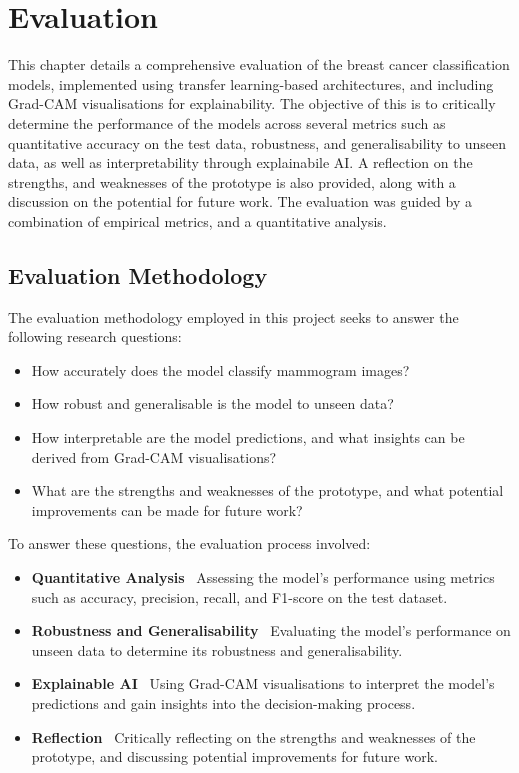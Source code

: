 \documentclass[../main]{subfiles}
\begin{document}
\chapter{Evaluation}
\label{ch:evaluation}
This chapter details a comprehensive evaluation of the breast cancer classification models, implemented using transfer learning-based architectures, and including Grad-CAM visualisations for explainability. The objective of this is to critically determine the performance of the models across several metrics such as quantitative accuracy on the test data, robustness, and generalisability to unseen data, as well as interpretability through explainabile AI. A reflection on the strengths, and weaknesses of the prototype is also provided, along with a discussion on the potential for future work. The evaluation was guided by a combination of empirical metrics, and a quantitative analysis.

\section{Evaluation Methodology}
\label{sec:evaluation-methodology}
The evaluation methodology employed in this project seeks to answer the following research questions:
\begin{itemize}
    \item How accurately does the model classify mammogram images?
    \item How robust and generalisable is the model to unseen data?
    \item How interpretable are the model predictions, and what insights can be derived from Grad-CAM visualisations?
    \item What are the strengths and weaknesses of the prototype, and what potential improvements can be made for future work?
\end{itemize}

To answer these questions, the evaluation process involved:
\begin{itemize}
    \item \textbf{Quantitative Analysis} \textemdash\ Assessing the model's performance using metrics such as accuracy, precision, recall, and F1-score on the test dataset.
    \item \textbf{Robustness and Generalisability} \textemdash\ Evaluating the model's performance on unseen data to determine its robustness and generalisability.
    \item \textbf{Explainable AI} \textemdash\ Using Grad-CAM visualisations to interpret the model's predictions and gain insights into the decision-making process.
    \item \textbf{Reflection} \textemdash\ Critically reflecting on the strengths and weaknesses of the prototype, and discussing potential improvements for future work.
\end{itemize}
\end{document}
